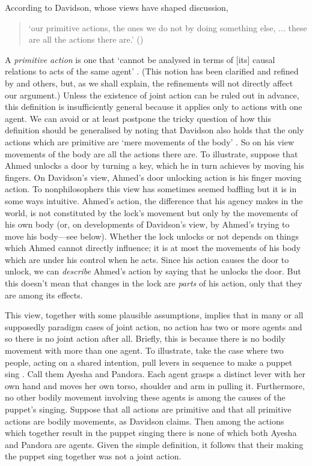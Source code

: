 \documentclass[12pt,a4paper]{extarticle}
\begin{document}
According to Davidson, whose views have shaped discussion,
%
\begin{quote}
`our primitive actions, the ones we do not by doing something else, ... these are all the actions there are.'
(\citeyear[p.\ 59]{Davidson:1971fz})
\end{quote}
%
A \emph{primitive action} is one that `cannot be analysed in terms of [its] causal relations to acts of the same agent' 
\citep[p.\ 49]{Davidson:1971fz}.
(This notion  has been clarified and refined by \citet{hornsby_actions_1980} and  others, but, as we shall explain, the refinements will not directly affect our argument.)
Unless the existence of joint action can be ruled out in advance, this definition is insufficiently general because it applies only to actions with one agent.
We can avoid or at least postpone the tricky question of how this definition should be generalised by noting that Davidson also holds that the only actions which are primitive are `mere movements of the body' \citep[p.\ 59]{Davidson:1971fz}.
So on his view movements of the body are all the actions there are.
To illustrate, suppose that Ahmed unlocks a door by turning a key, which he in turn achieves by moving his fingers.
On Davidson's view, Ahmed's door unlocking action is his finger moving action.
To nonphilosophers this view has sometimes seemed baffling
but it is in some ways intuitive.
Ahmed's action, the difference that his agency makes in the world,  is not constituted by the lock's movement but only by the movements of his own body
(or, on developments of Davidson's view, by Ahmed's trying to move his body---see below).
Whether the lock unlocks or not depends on things which Ahmed cannot directly influence; it is at most the movements of his body which are under his control when he acts.
Since his action causes the door to unlock, we can \emph{describe} Ahmed's action by saying that he unlocks the door.  
But this doesn't mean that changes in the lock are \emph{parts} of his action, only that they are among its effects.

This  view, together with some plausible assumptions, implies that in many or all supposedly paradigm cases of joint action, no action has two or more agents and so there is no joint action after all.
Briefly, this is because there is no bodily movement with more than one agent.
To illustrate, take the case where two people, acting on a shared intention, pull levers in sequence to make a puppet sing \citep{Brownell:2006gu}.
Call them Ayesha and Pandora.
Each agent grasps a distinct lever with her own hand and moves her own torso, shoulder and arm in pulling it.
Furthermore, no other bodily movement involving these 
agents is among the causes of the puppet's singing.
Suppose that all actions are primitive and that all primitive actions are  bodily movements, as Davidson claims.
Then among the actions which together result in the puppet singing there is none of which both Ayesha and Pandora are agents.
Given the simple definition, it follows that their making the puppet sing together was not a joint action.
\end{document}
